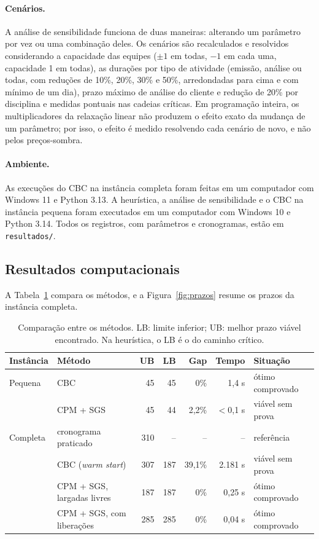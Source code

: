 \paragraph{Cenários.}
A análise de sensibilidade funciona de duas maneiras: alterando um parâmetro por vez ou uma combinação
deles. Os cenários são recalculados e resolvidos considerando a capacidade das equipes ($\pm1$ em todas, $-1$ em
cada uma, capacidade 1 em todas), as durações por tipo de atividade (emissão,
análise ou todas, com reduções de 10\%, 20\%, 30\% e 50\%, arredondadas
para cima e com mínimo de um dia), prazo máximo de análise do cliente e
redução de 20\% por disciplina e medidas pontuais nas cadeias críticas. Em
programação inteira, os multiplicadores da relaxação linear não produzem o
efeito exato da mudança de um parâmetro; por isso, o efeito é medido
resolvendo cada cenário de novo, e não pelos preços-sombra.

\paragraph{Ambiente.}
As execuções do CBC na instância completa foram feitas em um computador
com Windows 11 e Python 3.13. A heurística, a análise de sensibilidade e o
CBC na instância pequena foram executados em um computador com Windows 10
e Python 3.14. Todos os registros, com parâmetros e cronogramas, estão em
\texttt{resultados/}.

\subsection{Resultados computacionais}
\label{sec:resultados-comp}

A Tabela~\ref{tab:metodos} compara os métodos, e a
Figura~\ref{fig:prazos} resume os prazos da instância completa.

\begin{table}[htbp]
  \centering
  \caption{Comparação entre os métodos. LB: limite inferior; UB: melhor
  prazo viável encontrado. Na heurística, o LB é o do caminho crítico.}
  \label{tab:metodos}
  \small
  \begin{tabular}{llrrrrl}
    \toprule
    Instância & Método & UB & LB & Gap & Tempo & Situação \\
    \midrule
    Pequena  & CBC                   &  45 &  45 & 0\%    & 1,4 s     & ótimo comprovado \\
             & CPM + SGS             &  45 &  44 & 2,2\%  & $<$0,1 s  & viável sem prova \\
    \midrule
    Completa & cronograma praticado  & 310 & --  & --     & --        & referência \\
             & CBC (\emph{warm start}) & 307 & 187 & 39,1\% & 2.181 s & viável sem prova \\
             & CPM + SGS, largadas livres & 187 & 187 & 0\% & 0,25 s & ótimo comprovado \\
             & CPM + SGS, com liberações  & 285 & 285 & 0\% & 0,04 s & ótimo comprovado \\
    \bottomrule
  \end{tabular}
\end{table}

